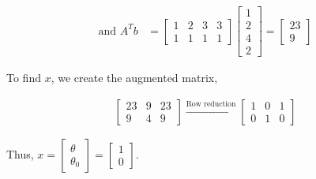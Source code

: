 \documentclass[pdf]{beamer}
\begin{document}
    \begin{frame}
        \begin{align*}
            \text{and }A^Tb&=\begin{bmatrix}
                1&2&3&3\\
                1&1&1&1
            \end{bmatrix}\begin{bmatrix}
                1\\2\\4\\2
            \end{bmatrix}=\begin{bmatrix}
                23\\9
            \end{bmatrix}
        \end{align*}

        To find \(x\), we create the augmented matrix,

        \begin{align*}
            \left[\begin{array}{cc|c}
                 23&9&23  \\
                 9& 4&9 
            \end{array}\right]\xrightarrow{\text{Row reduction}}\left[\begin{array}{cc|c}
                 1&0&1  \\
                 0&1&0 
            \end{array}\right]
        \end{align*}

        Thus, \(x=\begin{bmatrix}
            \theta\\\theta_0
        \end{bmatrix}=\begin{bmatrix}
            1\\0
        \end{bmatrix}\).
    \end{frame}
\end{document}
